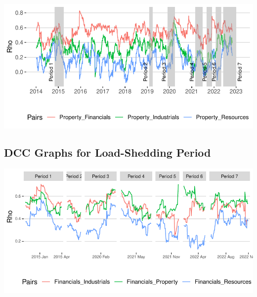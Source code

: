 \documentclass[11pt,preprint, authoryear]{elsarticle}
\let\origfigure\figure
\let\endorigfigure\endfigure
\renewenvironment{figure}[1][2] {
    \expandafter\origfigure\expandafter[H]
} {
    \endorigfigure
}
\numberwithin{equation}{section}
\numberwithin{figure}{section}
\numberwithin{table}{section}
\begin{document}
\begin{figure}[H]

{\centering \includegraphics{Paper_files/figure-latex/DCCfullp-1} 

}

\caption{Dynamic Conditional Correlations: Property \label{DCCfullp}}\label{fig:DCCfullp}
\end{figure}

\hypertarget{dcc-graphs-for-load-shedding-period}{%
\subsection{DCC Graphs for Load-Shedding
Period}\label{dcc-graphs-for-load-shedding-period}}

\begin{figure}[H]

{\centering \includegraphics{Paper_files/figure-latex/DCClsf-1} 

}

\caption{Load-Shedding Dynamic Conditional Correlations: Financials \label{DCClsf}}\label{fig:DCClsf}
\end{figure}
\end{document}
